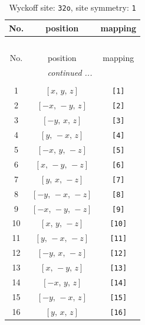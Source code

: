\documentclass[fleqn,8pt]{jsarticle}
\begin{document}
\begin{longtable}{ccc}
\caption{Wyckoff site: {\tt 32o}, site symmetry: {\tt 1}}
 \\
 \hline \hline
No. & position & mapping \\ \hline \endfirsthead

\multicolumn{2}{l}{\tablename\ \thetable{}} \\
 \hline \hline
No. & position & mapping \\ \hline \endhead

 \hline \hline
\multicolumn{2}{r}{\footnotesize\it continued ...} \\ \endfoot

 \hline \hline
\multicolumn{2}{r}{} \\ \endlastfoot

1 & $\left[ x,\, y,\, z \right]$ & {\tt [1]} \\ \hline
2 & $\left[ - x,\, - y,\, z \right]$ & {\tt [2]} \\ \hline
3 & $\left[ - y,\, x,\, z \right]$ & {\tt [3]} \\ \hline
4 & $\left[ y,\, - x,\, z \right]$ & {\tt [4]} \\ \hline
5 & $\left[ - x,\, y,\, - z \right]$ & {\tt [5]} \\ \hline
6 & $\left[ x,\, - y,\, - z \right]$ & {\tt [6]} \\ \hline
7 & $\left[ y,\, x,\, - z \right]$ & {\tt [7]} \\ \hline
8 & $\left[ - y,\, - x,\, - z \right]$ & {\tt [8]} \\ \hline
9 & $\left[ - x,\, - y,\, - z \right]$ & {\tt [9]} \\ \hline
10 & $\left[ x,\, y,\, - z \right]$ & {\tt [10]} \\ \hline
11 & $\left[ y,\, - x,\, - z \right]$ & {\tt [11]} \\ \hline
12 & $\left[ - y,\, x,\, - z \right]$ & {\tt [12]} \\ \hline
13 & $\left[ x,\, - y,\, z \right]$ & {\tt [13]} \\ \hline
14 & $\left[ - x,\, y,\, z \right]$ & {\tt [14]} \\ \hline
15 & $\left[ - y,\, - x,\, z \right]$ & {\tt [15]} \\ \hline
16 & $\left[ y,\, x,\, z \right]$ & {\tt [16]} \\
\end{longtable}
\end{document}
